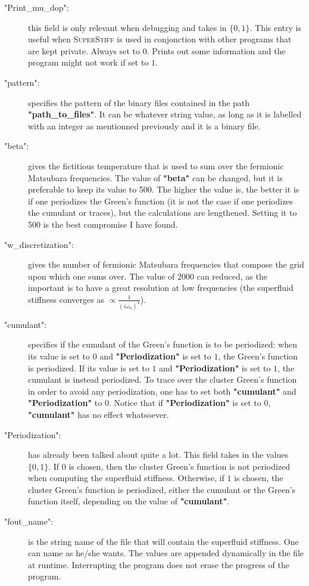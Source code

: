 \documentclass{article}
\begin{document}
\begin{description}
%
\item["Print\_mu\_dop":] this field is only relevant when debugging and takes in $\{0,1\}$. This entry is useful when \textsc{SuperStiff} is used in conjonction with other programs that are kept private. Always set to $0$. Prints out some information and the program might not work if set to $1$.
%
\item["pattern":] specifies the pattern of the binary files contained in the path \textbf{"path\_to\_files"}. It can be whatever string value, as long as it is labelled with an integer as mentionned previously and it is a binary file.
%
\item["beta":] gives the fictitious temperature that is used to sum over the fermionic Matsubara frequencies. The value of \textbf{"beta"} can be changed, but it is preferable to keep its value to 500. The higher the value is, the better it is if one periodizes the Green's function (it is not the case if one periodizes the cumulant or traces), but the calculations are lengthened. Setting it to 500 is the best compromise I have found.
%
\item["w\_discretization":] gives the number of fermionic Matsubara frequencies that compose the grid upon which one sums over. The value of 2000 can reduced, as the important is to have a great resolution at low frequencies (the superfluid stiffness converges as $\propto \frac{1}{(i\omega_n)^4}$).
%
\item["cumulant":] specifies if the cumulant of the Green's function is to be periodized: when its value is set to $0$ and \textbf{"Periodization"} is set to $1$, the Green's function is periodized. If its value is set to $1$ and \textbf{"Periodization"} is set to $1$, the cumulant is instead periodized. To trace over the cluster Green's function in order to avoid any periodization, one has to set both \textbf{"cumulant"} and \textbf{"Periodization"} to $0$. Notice that if \textbf{"Periodization"} is set to $0$, \textbf{"cumulant"} has no effect whatsoever.
%
\item["Periodization":] has already been talked about quite a lot. This field takes in the values $\{0,1\}$. If $0$ is chosen, then the cluster Green's function is not periodized when computing the superfluid stiffness. Otherwise, if $1$ is chosen, the cluster Green's function is periodized, either the cumulant or the Green's function itself, depending on the value of \textbf{"cumulant"}.
%
\item["fout\_name":] is the string name of the file that will contain the superfluid stiffness. One can name as he/she wants. The values are appended dynamically in the file at runtime. Interrupting the program does not erase the progress of the program.
\end{description}
\end{document}
